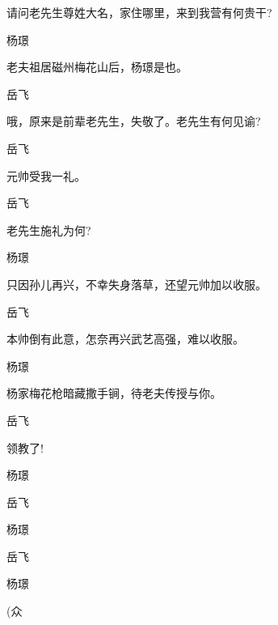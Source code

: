 {{{{请问老先生尊姓大名，家住哪里，来到我营有何贵干?}

{杨璟\hspace{30pt}~

老夫祖居磁州梅花山后，杨璟是也。}

{岳飞\hspace{30pt}~

哦，原来是前辈老先生，失敬了。老先生有何见谕?}

{岳飞\hspace{30pt}~

元帅受我一礼。}

{岳飞\hspace{30pt}~

老先生施礼为何?}

{杨璟\hspace{30pt}~

只因孙儿再兴，不幸失身落草，还望元帅加以收服。}

{岳飞\hspace{30pt}~

本帅倒有此意，怎奈再兴武艺高强，难以收服。}

{杨璟\hspace{30pt}~

杨家梅花枪暗藏撒手锏，待老夫传授与你。}

{岳飞\hspace{30pt}~

领教了!}

{杨璟\hspace{30pt}~

 }

{岳飞\hspace{30pt}~

 }

{杨璟\hspace{30pt}~

 }

{岳飞\hspace{30pt}~

 }

{杨璟\hspace{30pt}~

 }

{(众\hspace{40pt}~

}}}}

